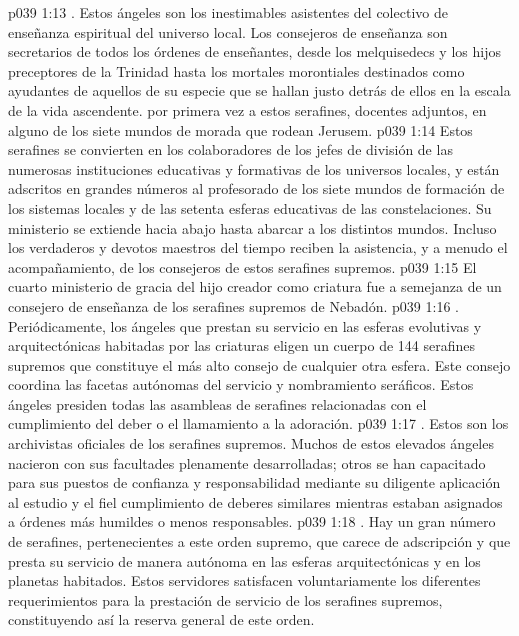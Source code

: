 \vs p039 1:13 . Estos ángeles son los inestimables asistentes del colectivo de enseñanza espiritual del universo local. Los consejeros de enseñanza son secretarios de todos los órdenes de enseñantes, desde los melquisedecs y los hijos preceptores de la Trinidad hasta los mortales morontiales destinados como ayudantes de aquellos de su especie que se hallan justo detrás de ellos en la escala de la vida ascendente.  por primera vez a estos serafines, docentes adjuntos, en alguno de los siete mundos de morada que rodean Jerusem.
\vs p039 1:14 Estos serafines se convierten en los colaboradores de los jefes de división de las numerosas instituciones educativas y formativas de los universos locales, y están adscritos en grandes números al profesorado de los siete mundos de formación de los sistemas locales y de las setenta esferas educativas de las constelaciones. Su ministerio se extiende hacia abajo hasta abarcar a los distintos mundos. Incluso los verdaderos y devotos maestros del tiempo reciben la asistencia, y a menudo el acompañamiento, de los consejeros de estos serafines supremos.
\vs p039 1:15 El cuarto ministerio de gracia del hijo creador como criatura fue a semejanza de un consejero de enseñanza de los serafines supremos de Nebadón.
\vs p039 1:16 . Periódicamente, los ángeles que prestan su servicio en las esferas evolutivas y arquitectónicas habitadas por las criaturas eligen un cuerpo de 144 serafines supremos que constituye el más alto consejo de cualquier otra esfera. Este consejo coordina las facetas autónomas del servicio y nombramiento seráficos. Estos ángeles presiden todas las asambleas de serafines relacionadas con el cumplimiento del deber o el llamamiento a la adoración.
\vs p039 1:17 . Estos son los archivistas oficiales de los serafines supremos. Muchos de estos elevados ángeles nacieron con sus facultades plenamente desarrolladas; otros se han capacitado para sus puestos de confianza y responsabilidad mediante su diligente aplicación al estudio y el fiel cumplimiento de deberes similares mientras estaban asignados a órdenes más humildes o menos responsables.
\vs p039 1:18 . Hay un gran número de serafines, pertenecientes a este orden supremo, que carece de adscripción y que presta su servicio de manera autónoma en las esferas arquitectónicas y en los planetas habitados. Estos servidores satisfacen voluntariamente los diferentes requerimientos para la prestación de servicio de los serafines supremos, constituyendo así la reserva general de este orden.
